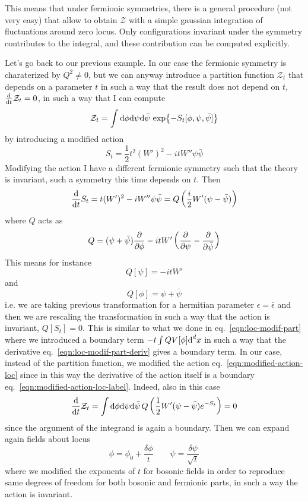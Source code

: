 \documentclass[../main/main.tex]{subfiles}
\begin{document}
This means that under fermionic symmetries, there is a general procedure (not very easy) that allow to obtain $\mathcal Z$ with a simple gaussian integration of fluctuations around zero locus. Only configurations invariant under the symmetry contributes to the integral, and these contribution can be computed explicitly. 

Let's go back to our previous example. In our case the fermionic symmetry is charaterized by $Q^2\neq0$, but we can anyway introduce a partition function $\mathcal Z_t$ that depends on a parameter $t$ in such a way that the result does not depend on $t$, $\frac{\textup{d}}{\textup{d} t}\mathcal Z_t=0$, in such a way that I can compute 
\[\mathcal Z_t=\int\textup{d}\phi\textup{d}\psi\textup{d}\bar\psi\,\exp{-S_t[\phi,\psi,\bar\psi]}\]
by introducing a modified action
\begin{equation}\label{eqn:modified-action-loc}
S_t=\frac12t^2(W')^2-itW''\psi\bar\psi
\end{equation}
Modifying the action I have a different fermionic symmetry such that the theory is invariant, such a symmetry this time depends on $t$. Then
\begin{equation}\label{eqn:modified-action-loc-label}
\frac{\textup{d}}{\textup{d} t}S_t=t(W')^2-iW''\psi\bar\psi=Q\left(\frac i2W'(\psi-\bar\psi)\right)
\end{equation}
where $Q$ acts as
\[Q=(\psi+\bar\psi)\frac\partial{\partial \phi}-itW'\left(\frac\partial{\partial\psi}-\frac\partial{\partial\bar\psi}\right)\]
This means for instance
\[Q[\psi]=-itW'\]
and
\[Q[\phi]=\psi+\bar\psi\]
i.e. we are taking previous transformation for a hermitian parameter $\epsilon=\bar\epsilon$ and then we are rescaling the transformation in such a way that the action is invariant, $Q[S_t]=0$. 
This is similar to what we done in eq.~\eqref{eqn:loc-modif-part} where we introduced a boundary term $-t\int QV[\phi]\textup{d}^dx$ in such a way that the derivative eq.~\eqref{eqn:loc-modif-part-deriv} gives a boundary term. In our case, instead of the partition function, we modified the action eq.~\eqref{eqn:modified-action-loc} since in this way the derivative of the action itself is a boundary eq.~\eqref{eqn:modified-action-loc-label}. Indeed, also in this case
\[\frac{\textup{d}}{\textup{d} t}\mathcal Z_t=\int\textup{d}\phi\textup{d}\psi\textup{d}\bar\psi\,Q\left(\frac12W'(\psi-\bar\psi)e^{-S_t}\right)=0\]
since the argument of the integrand is again a boundary. 
Then we can expand again fields about locus
\[\phi=\phi_0+\frac{\delta\phi}{t}\qquad\psi=\frac{\delta\psi}{\sqrt t}\]
where we modified the exponents of $t$ for bosonic fields in order to reproduce same degrees of freedom for both bosonic and fermionic parts, in such a way the action is invariant. 
\end{document}
